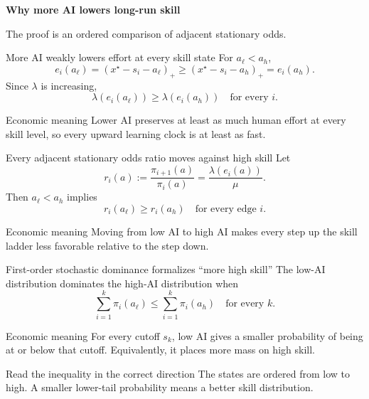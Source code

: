 \documentclass[aspectratio=169,11pt]{beamer}
\newcommand{\pos}[1]{\left(#1\right)_{+}}
\newcommand{\econmeaning}[1]{%
  \begin{block}{Economic meaning}
  #1
  \end{block}}
\begin{document}

\begin{frame}[plain]
  \vspace{23mm}
  {\color{white}\Huge\bfseries Why more AI lowers long-run skill\par}
  \vspace{8mm}
  {\color{white!82}\Large The proof is an ordered comparison of adjacent stationary odds.\par}
\end{frame}

\begin{frame}{More AI weakly lowers effort at every skill state}
For $a_\ell<a_h$,
\[
e_i(a_\ell)=\pos{x^\star-s_i-a_\ell}
\ge
\pos{x^\star-s_i-a_h}=e_i(a_h).
\]
Since $\lambda$ is increasing,
\[
\boxed{\lambda(e_i(a_\ell))\ge\lambda(e_i(a_h))
\quad\text{for every }i.}
\]
\econmeaning{Lower AI preserves at least as much human effort at every skill level, so every upward learning clock is at least as fast.}
\end{frame}

\begin{frame}{Every adjacent stationary odds ratio moves against high skill}
Let
\[
r_i(a):=\frac{\pi_{i+1}(a)}{\pi_i(a)}
=\frac{\lambda(e_i(a))}{\mu}.
\]
Then $a_\ell<a_h$ implies
\[
\boxed{r_i(a_\ell)\ge r_i(a_h)
\quad\text{for every edge }i.}
\]
\econmeaning{Moving from low AI to high AI makes every step up the skill ladder less favorable relative to the step down.}
\end{frame}

\begin{frame}{First-order stochastic dominance formalizes ``more high skill''}
The low-AI distribution dominates the high-AI distribution when
\[
\boxed{
\sum_{i=1}^{k}\pi_i(a_\ell)
\le
\sum_{i=1}^{k}\pi_i(a_h)
\quad\text{for every }k.}
\]
\econmeaning{For every cutoff $s_k$, low AI gives a smaller probability of being at or below that cutoff. Equivalently, it places more mass on high skill.}
\begin{alertblock}{Read the inequality in the correct direction}
The states are ordered from low to high. A smaller lower-tail probability means a better skill distribution.
\end{alertblock}
\end{frame}
\end{document}
